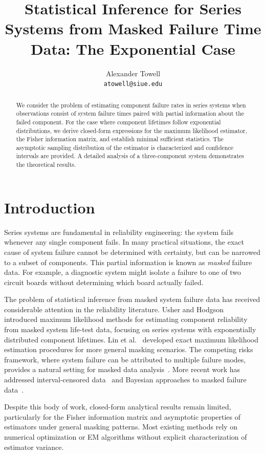 \documentclass[12pt]{article}
\title{Statistical Inference for Series Systems from Masked Failure Time Data: The Exponential Case}
\author{Alexander Towell\\\texttt{atowell@siue.edu}}
\date{}
\theoremstyle{definition}
\begin{document}
\maketitle

\begin{abstract}
We consider the problem of estimating component failure rates in series systems when observations consist of system failure times paired with partial information about the failed component. For the case where component lifetimes follow exponential distributions, we derive closed-form expressions for the maximum likelihood estimator, the Fisher information matrix, and establish minimal sufficient statistics. The asymptotic sampling distribution of the estimator is characterized and confidence intervals are provided. A detailed analysis of a three-component system demonstrates the theoretical results.
\end{abstract}

\tableofcontents

\section{Introduction}
\label{sec:intro}

Series systems are fundamental in reliability engineering: the system fails whenever any single component fails. In many practical situations, the exact cause of system failure cannot be determined with certainty, but can be narrowed to a subset of components. This partial information is known as \emph{masked} failure data. For example, a diagnostic system might isolate a failure to one of two circuit boards without determining which board actually failed.

The problem of statistical inference from masked system failure data has received considerable attention in the reliability literature. Usher and Hodgson~\cite{usher1988} introduced maximum likelihood methods for estimating component reliability from masked system life-test data, focusing on series systems with exponentially distributed component lifetimes. Lin et al.~\cite{exactmle} developed exact maximum likelihood estimation procedures for more general masking scenarios. The competing risks framework, where system failure can be attributed to multiple failure modes, provides a natural setting for masked data analysis~\cite{agustin}. More recent work has addressed interval-censored data~\cite{reliability} and Bayesian approaches to masked failure data~\cite{kuo2007}.

Despite this body of work, closed-form analytical results remain limited, particularly for the Fisher information matrix and asymptotic properties of estimators under general masking patterns. Most existing methods rely on numerical optimization or EM algorithms without explicit characterization of estimator variance.
\end{document}
